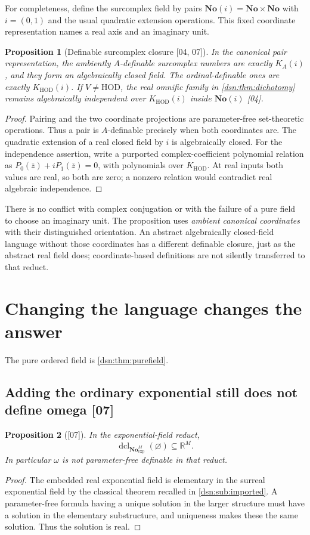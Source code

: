 \documentclass[11pt,a4paper]{article}
\numberwithin{equation}{section}
\newtheorem{proposition}[proposition]{Proposition}
\theoremstyle{definition}
\theoremstyle{remark}
\newcommand{\No}{\mathbf{No}}
\newcommand{\HOD}{\mathrm{HOD}}
\newcommand{\R}{\mathbb R}
\newcommand{\dcl}{\operatorname{dcl}}
\newcommand{\KH}{K_{\HOD}}
\newcommand{\src}[1]{\textup{\textsf{\small[#1]}}}
\begin{document}
For completeness, define the surcomplex field by pairs
$\No(i)=\No\times\No$ with $i=(0,1)$ and the usual quadratic
extension operations. This fixed coordinate representation names a
real axis and an imaginary unit.

\begin{proposition}[Definable surcomplex closure \src{04, 07}]
\label{dsn:prop:surcomplex}
In the canonical pair representation, the ambiently $A$-definable
surcomplex numbers are exactly $K_A(i)$, and they form an algebraically
closed field. The ordinal-definable ones are exactly $\KH(i)$.
If $V\ne\HOD$, the real omnific family in
\cref{dsn:thm:dichotomy} remains algebraically independent over
$\KH(i)$ inside $\No(i)$ \src{04}.
\end{proposition}
\begin{proof}
Pairing and the two coordinate projections are parameter-free
set-theoretic operations. Thus a pair is $A$-definable precisely when
both coordinates are. The quadratic extension of a real closed field
by $i$ is algebraically closed. For the independence assertion,
write a purported complex-coefficient polynomial relation as
$P_0(\bar z)+iP_1(\bar z)=0$, with polynomials over $\KH$.
At real inputs both values are real, so both are zero; a nonzero
relation would contradict real algebraic independence.
\end{proof}

There is no conflict with complex conjugation or with the failure of
a pure field to choose an imaginary unit. The proposition uses
\emph{ambient canonical coordinates} with their distinguished orientation.
An abstract algebraically closed-field language without those coordinates
has a different definable closure, just as the abstract real field does;
coordinate-based definitions are not silently transferred to that reduct.

\section{Changing the language changes the answer}
\label{dsn:sec:languages}

The pure ordered field is \cref{dsn:thm:purefield}.

\subsection{Adding the ordinary exponential still does not define omega \src{07}}

\begin{proposition}[\src{07}]\label{dsn:prop:exp-no-omega}
In the exponential-field reduct,
\[
 \dcl_{\No^M_{\exp}}(\varnothing)\subseteq\R^M.
\]
In particular $\omega$ is not parameter-free definable in that reduct.
\end{proposition}
\begin{proof}
The embedded real exponential field is elementary in the surreal
exponential field by the classical theorem recalled in
\cref{dsn:sub:imported}. A parameter-free formula having a unique solution
in the larger structure must have a solution in the elementary
substructure, and uniqueness makes these the same solution. Thus the
solution is real.
\end{proof}
\end{document}
